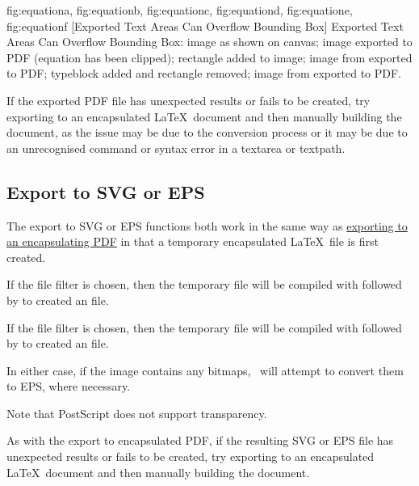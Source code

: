 {
 {fig:equationa}{}{},
 {fig:equationb}{}{},
 {fig:equationc}{}{},
 {fig:equationd}{}{},
 {fig:equatione}{}{},
 {fig:equationf}{}{}
}
[Exported Text Areas Can Overflow Bounding Box]
{Exported Text Areas Can Overflow Bounding Box:
 image as shown on canvas;
 image exported to PDF (equation has been clipped);
 rectangle added to image;
 image from  exported to PDF;
 typeblock added and rectangle removed;
 image from  exported to PDF.}

If the exported PDF file has unexpected results or fails to be
created, try exporting to an encapsulated \LaTeX\ document and then
manually building the document, as the issue may be due to the
conversion process or it may be due to an unrecognised command or
syntax error in a \gls{textarea} or \gls{textpath}.


\subsection{Export to SVG or EPS}\label{sec:exportsvgeps}

The export to SVG or EPS functions both work in the same way
as \hyperref[sec:exportdoc]{exporting to an encapsulating PDF}
in that a temporary encapsulated \LaTeX\ file is first created.

If the  file filter is chosen, then the temporary
file will be compiled with  followed by
 to created an   file.

If the  file filter is chosen, then the temporary
file will be compiled with  followed by
 to created an  file.

In either case, if the image contains any
\glspl{bitmap}, \FlowframTk\ will attempt to convert
them to EPS, where necessary.

\begin{important}
Note that PostScript does not support transparency.
\end{important}

As with the export to encapsulated PDF, if the resulting SVG or EPS
file has unexpected results or fails to be created, try exporting to
an encapsulated \LaTeX\ document and then manually building the
document.


